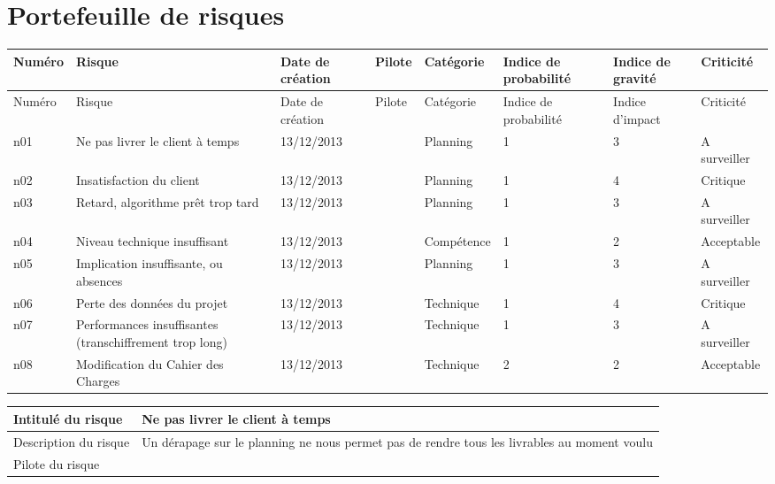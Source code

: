 \documentclass[a4paper,11pt,french]{article}
\begin{document}
\newpage
\section{Portefeuille de risques}

\begin{landscape}

\begin{longtable}{|m{1.5cm}|m{4cm}|m{3cm}|m{3.2cm}|m{2.2cm}|m{2cm}|m{2cm}|m{2.2cm}|}
\hline
\rowcolor[gray]{.8}
Numéro & Risque & Date de création & Pilote & Catégorie \footnotemark[1] & Indice de probabilité & Indice de gravité & Criticité \footnotemark[2] \\ 
\hline
\endfirsthead
\hline
\rowcolor[gray]{.8}
Numéro & Risque & Date de création & Pilote & Catégorie \footnotemark[1] & Indice de probabilité & Indice d'impact & Criticité \footnotemark[2] \\ 
\hline

\endhead
n01 & Ne pas livrer le client à temps & 13/12/2013 &  & Planning & 1 & 3 & A surveiller \\
\hline
n02 & Insatisfaction du client & 13/12/2013 & & Planning & 1 & 4 &  Critique \\
\hline
n03 & Retard, algorithme prêt trop tard & 13/12/2013 & & Planning & 1 & 3 & A surveiller \\
\hline
n04 & Niveau technique insuffisant & 13/12/2013 &  &  Compétence & 1 & 2 & Acceptable \\
\hline
n05 & Implication insuffisante, ou absences & 13/12/2013 &  & Planning & 1 & 3 & A surveiller \\
\hline
n06 & Perte des données du projet & 13/12/2013 &  & Technique & 1 & 4 & Critique \\
\hline
n07 & Performances insuffisantes (transchiffrement trop long) & 13/12/2013 &  & Technique & 1 & 3 & A surveiller \\
\hline
n08 & Modification du Cahier des Charges & 13/12/2013 &  & Technique & 2 & 2 & Acceptable \\
\hline

\end{longtable}

\end{landscape}

\newpage




\begin{center}
\begin{tabular}{|>{\columncolor[gray]{.8}}m{8cm}|m{8cm}|}
\hline
 Intitulé du risque & Ne pas livrer le client à temps \\
\hline
 Description du risque & Un dérapage sur le planning ne nous permet pas de rendre tous les livrables au moment voulu  \\
\hline
Pilote du risque &  \\
\hline
\end{tabular}
\end{center}
\end{document}
